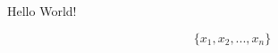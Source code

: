 \documentclass{article}
\begin{document}
Hello World! %


\begin{equation}
    \{ x_1, x_2, ... , x_n \}
\end{equation} %


\end{document}
